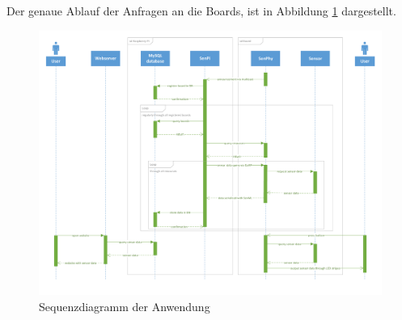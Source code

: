 \documentclass[a4paper]{article}
\begin{document}
Der genaue Ablauf der Anfragen an die Boards, ist in Abbildung \ref{fig:seq_diagram} 
dargestellt.
\begin{figure}[h]
\centering
\includegraphics[scale=0.5]{sequenceDiagram.pdf}
\caption{\label{fig:seq_diagram}Sequenzdiagramm der Anwendung}
\end{figure}
\end{document}
